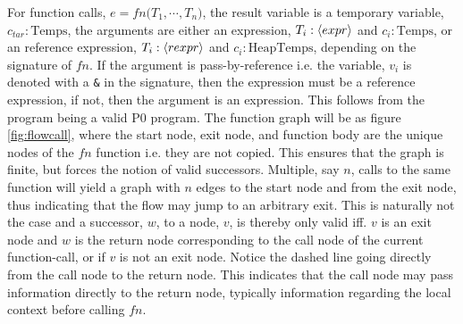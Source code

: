 For function calls, $e = fn\texttt{(}T_1,\cdots, T_n\texttt{)}$, the result variable is a temporary variable, $c_{tar}:\text{Temps}$, the arguments are either an expression, $T_i : \langle expr\rangle$ and $c_i : \text{Temps}$, or an reference expression, $T_i : \langle rexpr\rangle$ and $c_i : \text{HeapTemps}$, depending on the signature of $fn$. If the argument is pass-by-reference i.e. the variable, $v_i$ is denoted with a \texttt{\&} in the signature, then the expression must be a reference expression, if not, then the argument is an expression. This follows from the program being a valid P0 program. The function graph will be as figure \ref{fig:flowcall}, where the start node, exit node, and function body are the unique nodes of the $fn$ function i.e. they are not copied. This ensures that the graph is finite, but forces the notion of valid successors. Multiple, say $n$, calls to the same function will yield a graph with $n$ edges to the start node and from the exit node, thus indicating that the flow may jump to an arbitrary exit. This is naturally not the case and a successor, $w$, to a node, $v$, is thereby only valid iff. $v$ is an exit node and $w$ is the return node corresponding to the call node of the current function-call, or if $v$ is not an exit node. Notice the dashed line going directly from the call node to the return node. This indicates that the call node may pass information directly to the return node, typically information regarding the local context before calling $fn$.


\begin{figure}
\ContinuedFloat
\hspace*{\fill}
\hspace*{\fill}
\end{figure}

